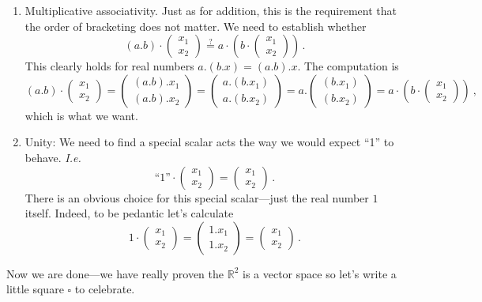 {\begin{enumerate}
\begin{gather*}
=
a\begin{pmatrix}x_1\\x_2\end{pmatrix}+
a\begin{pmatrix}y_1\\y_2\end{pmatrix}
\, ,
\end{gather*} 
again as required.
\item[($\cdot$iv)] Multiplicative associativity. 
Just as for addition, this is the requirement that the
order of bracketing does not matter.
We need to establish whether
\[
(a.b)\cdot\begin{pmatrix}x_1\\x_2\end{pmatrix}
\stackrel?=
a\cdot\left(b\cdot \begin{pmatrix}x_1\\x_2\end{pmatrix}\right)\, .
\]
This clearly holds for real numbers $a.(b.x)=(a.b).x$. The computation is
\[
(a.b)\cdot\begin{pmatrix}x_1\\x_2\end{pmatrix}
=
\begin{pmatrix}(a.b).x_1\\(a.b).x_2\end{pmatrix}
=
\begin{pmatrix}a.(b.x_1)\\a.(b.x_2)\end{pmatrix}
=
a.\begin{pmatrix}(b.x_1)\\(b.x_2)\end{pmatrix}
=
a\cdot\left(b\cdot \begin{pmatrix}x_1\\x_2\end{pmatrix}\right)\ ,
\]
which is what we want.
\item[($\cdot$v)] Unity: We need to find a special scalar
acts the way we would expect ``1'' to behave. {\itshape I.e.} \[
\mbox{``1''}\cdot\begin{pmatrix}x_1\\x_2\end{pmatrix}=\begin{pmatrix}x_1\\x_2\end{pmatrix}\, .
\]
There is an obvious choice for this special scalar---just the real number $1$ itself. Indeed, to be pedantic let's calculate
\[
1\cdot\begin{pmatrix}x_1\\x_2\end{pmatrix}=\begin{pmatrix}1.x_1\\1.x_2\end{pmatrix}=\begin{pmatrix}x_1\\x_2\end{pmatrix}\, .
\]
\end{enumerate}
Now we are done---we have really proven the ${\mathbb R}^2$ is a vector space so let's write a little square $\square$ to celebrate.


}

